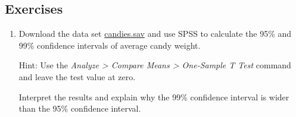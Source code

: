 \documentclass[a4paper]{book}
\theoremstyle{definition}
\theoremstyle{definition}
\theoremstyle{definition}
\theoremstyle{remark}
\begin{document}
\subsection{Exercises}\label{exercises-2}

\begin{enumerate}
\def\labelenumi{\arabic{enumi}.}
\item
  Download the data set
  \href{http://82.196.4.233:3838/data/candies.sav}{candies.sav} and use
  SPSS to calculate the 95\% and 99\% confidence intervals of average
  candy weight.

  Hint: Use the \emph{Analyze \textgreater{} Compare Means
  \textgreater{} One-Sample T Test} command and leave the test value at
  zero.

  Interpret the results and explain why the 99\% confidence interval is
  wider than the 95\% confidence interval.
\end{enumerate}
\end{document}
